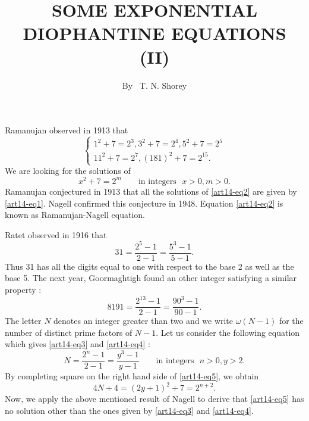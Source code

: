 \title{SOME EXPONENTIAL DIOPHANTINE EQUATIONS (II)}

\author{By~ T. N. Shorey}

\date{}
\maketitle

\setcounter{pageoriginal}{216}
\section{}\label{art14-sec1}\pageoriginale
Ramanujan \cite{art14-key19} observed in 1913 that
\begin{equation}
\begin{cases}
1^{2}+7=2^{3}, 3^{2}+7=2^{4}, 5^{2}+7=2^{5}\\
11^{2}+7=2^{7}, (181)^{2}+7=2^{15}.
\end{cases}\label{art14-eq1}
\end{equation}
We are looking for the solutions of
\begin{equation}
x^{2}+7=2^{m}\qquad\text{in integers~ } x>0, m>0.\label{art14-eq2}
\end{equation}
Ramanujan \cite{art14-key19} conjectured in 1913 that all the solutions of \eqref{art14-eq2} are given by \eqref{art14-eq1}. Nagell \cite{art14-key17} confirmed this conjecture in 1948. Equation \eqref{art14-eq2} is known as Ramanujan-Nagell equation.

Ratet \cite{art14-key20} observed in 1916 that
\begin{equation}
31=\frac{2^{5}-1}{2-1}=\dfrac{5^{3}-1}{5-1}.\label{art14-eq3}
\end{equation}
Thus 31 has all the digits equal to one with respect to the base 2 as well as the base 5. The next year, Goormaghtigh \cite{art14-key11} found an other integer satisfying a similar property :
\begin{equation}
8191=\frac{2^{13}-1}{2-1}=\dfrac{90^{3}-1}{90-1}.\label{art14-eq4}
\end{equation}
The letter $N$ denotes an integer greater than two and we write $\omega(N-1)$ for the number of distinct prime factors of $N-1$. Let us consider the following equation which gives \eqref{art14-eq3} and \eqref{art14-eq4} :
\begin{equation}
N=\frac{2^{n}-1}{2-1}=\dfrac{y^{3}-1}{y-1}\qquad\text{in integers~ } n>0, y>2.\label{art14-eq5}
\end{equation}
By completing square on the right hand side of \eqref{art14-eq5}, we obtain
$$
4N+4=(2y+1)^{2}+7=2^{n+2}.
$$
Now, we apply the above mentioned result of Nagell to derive that \eqref{art14-eq5} has no solution other than the ones given by \eqref{art14-eq3} and \eqref{art14-eq4}.

